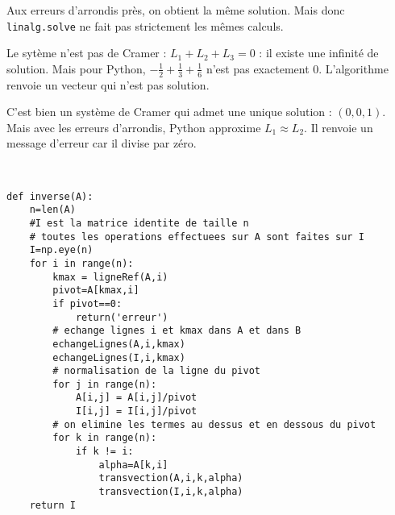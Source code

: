 \setcounter{solution}{5}

\begin{solution}
Aux erreurs d'arrondis pr\` es, on obtient la m\^ eme solution. Mais donc \verb?linalg.solve? ne fait pas strictement les m\^ emes calculs.
\end{solution}

\begin{solution}
Le syt\` eme n'est pas de Cramer : $L_1+L_2+L_3=0$ : il existe une infinit\' e de solution. Mais pour Python, $-\frac{1}{2}+\frac{1}{3}+\frac{1}{6}$ n'est pas exactement 0. L'algorithme renvoie un vecteur qui n'est pas solution.
\end{solution}

\begin{solution}
C'est bien un syst\` eme de Cramer qui admet une unique solution : $(0,0,1)$. Mais avec les erreurs d'arrondis, Python approxime $L_1\approx L_2$. Il renvoie un message d'erreur car il divise par z\' ero.
\end{solution}


\begin{solution}~\\
\vspace*{-0.7cm}
\begin{verbatim}
def inverse(A):
    n=len(A)
    #I est la matrice identite de taille n
    # toutes les operations effectuees sur A sont faites sur I
    I=np.eye(n)
    for i in range(n):
        kmax = ligneRef(A,i)
        pivot=A[kmax,i]   
        if pivot==0:
            return('erreur')
        # echange lignes i et kmax dans A et dans B
        echangeLignes(A,i,kmax)
        echangeLignes(I,i,kmax)
        # normalisation de la ligne du pivot
        for j in range(n):
            A[i,j] = A[i,j]/pivot   
            I[i,j] = I[i,j]/pivot
        # on elimine les termes au dessus et en dessous du pivot
        for k in range(n):
            if k != i:
                alpha=A[k,i]
                transvection(A,i,k,alpha)  
                transvection(I,i,k,alpha)       
    return I
\end{verbatim}
\end{solution}


